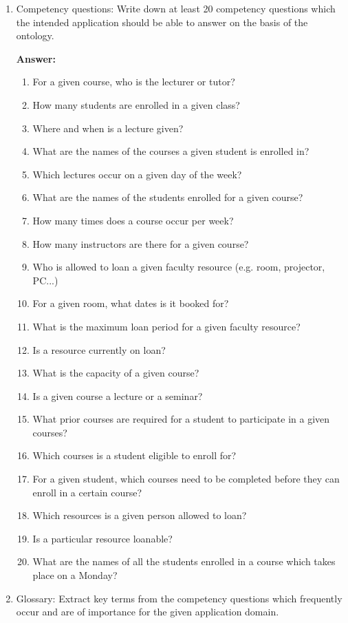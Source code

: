 \documentclass[10pt,a4paper]{article}
\begin{document}
\begin{enumerate}
\begin{enumerate}
\item Competency questions: Write down at least 20 competency questions which the intended application should be able to answer on the basis of the ontology.

\textbf{Answer:}

\begin{enumerate}

\item For a given course, who is the lecturer or tutor?
\item  How many students are enrolled in a given class?
\item Where and when is a lecture given?
\item What are the names of the courses a given student is enrolled in?
\item Which lectures occur on a given day of the week?
\item What are the names of the students enrolled for a given course?
\item How many times does a course occur per week?
\item How many instructors are there for a given course?
\item Who is allowed to loan a given faculty resource (e.g. room, projector, PC...)
\item For a given room, what dates is it booked for?
\item What is the maximum loan period for a given faculty resource?
\item Is a resource currently on loan?
\item What is the capacity of a given course?
\item Is a given course a lecture or a seminar?
\item What prior courses are required for a student to participate in a given courses?
\item Which courses is a student eligible to enroll for?
\item For a given student, which courses need to be completed before they can enroll in a certain course?
\item Which resources is a given person allowed to loan?
\item Is a particular resource loanable?
\item What are the names of all the students enrolled in a course which takes place on a Monday?
\end{enumerate}

\item Glossary: Extract key terms from the competency questions which frequently occur and are of importance for the given application domain. 


\end{enumerate}
\end{enumerate}
\end{document}
